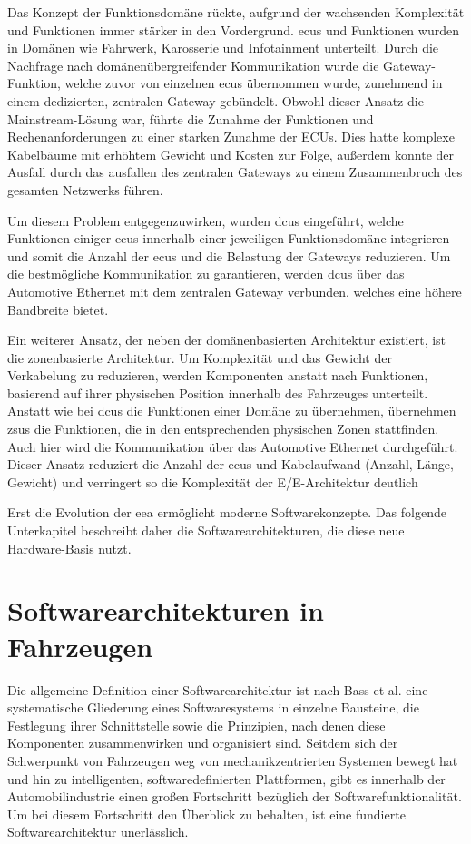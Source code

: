 Das Konzept der Funktionsdomäne rückte, aufgrund der wachsenden Komplexität und Funktionen immer stärker in den Vordergrund. \glspl{ecu} und Funktionen wurden in Domänen wie Fahrwerk, Karosserie und Infotainment unterteilt. Durch die Nachfrage nach domänenübergreifender Kommunikation wurde die Gateway-Funktion, welche zuvor von einzelnen \glspl{ecu} übernommen wurde, zunehmend in einem dedizierten, zentralen Gateway gebündelt.
Obwohl dieser Ansatz die Mainstream-Lösung war, führte die Zunahme der Funktionen und Rechenanforderungen zu einer starken Zunahme der ECUs. Dies hatte komplexe Kabelbäume mit erhöhtem Gewicht und Kosten zur Folge, außerdem konnte der Ausfall durch das ausfallen des zentralen Gateways zu einem Zusammenbruch des gesamten Netzwerks führen.

Um diesem Problem entgegenzuwirken, wurden \glspl{dcu} eingeführt, welche Funktionen einiger \glspl{ecu} innerhalb einer jeweiligen Funktionsdomäne integrieren und somit die Anzahl der \glspl{ecu} und die Belastung der Gateways reduzieren. Um die bestmögliche Kommunikation zu garantieren, werden \glspl{dcu} über das Automotive Ethernet mit dem zentralen Gateway verbunden, welches eine höhere Bandbreite bietet.

Ein weiterer Ansatz, der neben der domänenbasierten Architektur existiert, ist die zonenbasierte Architektur. Um Komplexität und das Gewicht der Verkabelung zu reduzieren, werden Komponenten anstatt nach Funktionen, basierend auf ihrer physischen Position innerhalb des Fahrzeuges unterteilt. Anstatt wie bei \glspl{dcu} die Funktionen einer Domäne zu übernehmen, übernehmen \glspl{zsu} die Funktionen, die in den entsprechenden physischen Zonen stattfinden. Auch hier wird die Kommunikation über das Automotive Ethernet durchgeführt. Dieser Ansatz reduziert die Anzahl der \glspl{ecu} und Kabelaufwand (Anzahl, Länge, Gewicht) und verringert so die Komplexität der E/E-Architektur deutlich

Erst die Evolution der \gls{eea} ermöglicht moderne Softwarekonzepte. Das folgende Unterkapitel beschreibt daher die Softwarearchitekturen, die diese neue Hardware-Basis nutzt.

\section{Softwarearchitekturen in Fahrzeugen}
\label{sect:sa}
Die allgemeine Definition einer Softwarearchitektur ist nach Bass et al. \cite{bass2021} eine systematische Gliederung eines Softwaresystems in einzelne Bausteine, die Festlegung ihrer Schnittstelle sowie die Prinzipien, nach denen diese Komponenten zusammenwirken und organisiert sind. Seitdem sich der Schwerpunkt von Fahrzeugen weg von mechanikzentrierten Systemen bewegt hat und hin zu intelligenten, softwaredefinierten Plattformen, gibt es innerhalb der Automobilindustrie einen großen Fortschritt bezüglich der Softwarefunktionalität. Um bei diesem Fortschritt den Überblick zu behalten, ist eine fundierte Softwarearchitektur unerlässlich.

